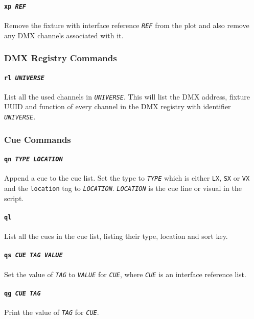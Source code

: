 \documentclass[a4paper]{article}
\begin{document}
\paragraph{\texttt{xp \textit{REF}}}
Remove the fixture with interface reference \texttt{\textit{REF}} from the 
plot and also remove any DMX channels associated with it.

\subsubsection{DMX Registry Commands}

\paragraph{\texttt{rl \textit{UNIVERSE}}}
List all the used channels in \texttt{\textit{UNIVERSE}}. This will list the 
DMX address, fixture UUID and function of every channel in the DMX registry 
with identifier \texttt{\textit{UNIVERSE}}.

\subsubsection{Cue Commands}

\paragraph{\texttt{qn \textit{TYPE LOCATION}}}
Append a cue to the cue list. Set the type to \texttt{\textit{TYPE}} which is 
either \texttt{LX}, \texttt{SX} or \texttt{VX} and the \texttt{location} tag 
to \texttt{\textit{LOCATION}}. \texttt{\textit{LOCATION}} is the cue line or 
visual in the script.

\paragraph{\texttt{ql}}
List all the cues in the cue list, listing their type, location and sort key.

\paragraph{\texttt{qs \textit{CUE TAG VALUE}}}
Set the value of \texttt{\textit{TAG}} to \texttt{\textit{VALUE}} for 
\texttt{\textit{CUE}}, where \texttt{\textit{CUE}} is an interface reference 
list.

\paragraph{\texttt{qg \textit{CUE TAG}}}
Print the value of \texttt{\textit{TAG}} for \texttt{\textit{CUE}}.
\end{document}
